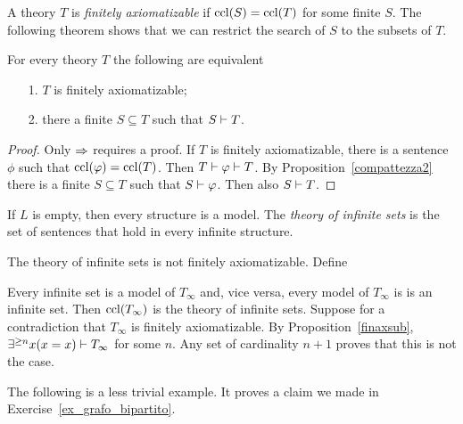 \documentclass[creche.tex]{subfiles}
\begin{document}
A theory $T$ is \emph{finitely axiomatizable\/} if ${\rm ccl}(S)={\rm ccl}(T)$ for some finite $S$. The following theorem shows that we can restrict the search of $S$ to the subsets of $T$.

\begin{proposition}\label{finaxsub} For every theory $T$ the following are equivalent
\begin{itemize}
\item[1.] $T$ is finitely axiomatizable;
\item[2.] there a finite $S\subseteq T$ such that $S\vdash T$.
\end{itemize}
\end{proposition}

\begin{proof}
Only $\Rightarrow$ requires a proof. If $T$ is finitely axiomatizable, there is a sentence $\phi$ such that ${\rm ccl}(\varphi)={\rm ccl}(T)$. Then $T\vdash\varphi\vdash T$. By Proposition~\ref{compattezza2} there is a finite $S\subseteq T$ such that $S\vdash\varphi$. Then also $S\vdash T$.
\end{proof}

If $L$ is empty, then every structure is a model. The \emph{theory of infinite sets\/} is the set of sentences that hold in every infinite structure.

\begin{example} 
The theory of infinite sets is not finitely axiomatizable. Define


Every infinite set is a model of $T_{\infty}$ and, vice versa, every model of $T_{\infty}$ is is an infinite set. Then ${\rm ccl}(T_{\infty})$ is the theory of infinite sets. Suppose for a contradiction that $T_{\infty}$ is finitely axiomatizable. By Proposition~\ref{finaxsub}, $\exists^{\ge n}x (x=x)\vdash T_{\infty}$ for some $n$. Any set of cardinality $n+1$ proves that this is not the case.\QED
\end{example}

The following is a less trivial example. It proves a claim we made in Exercise~\ref{ex_grafo_bipartito}.
\end{document}
